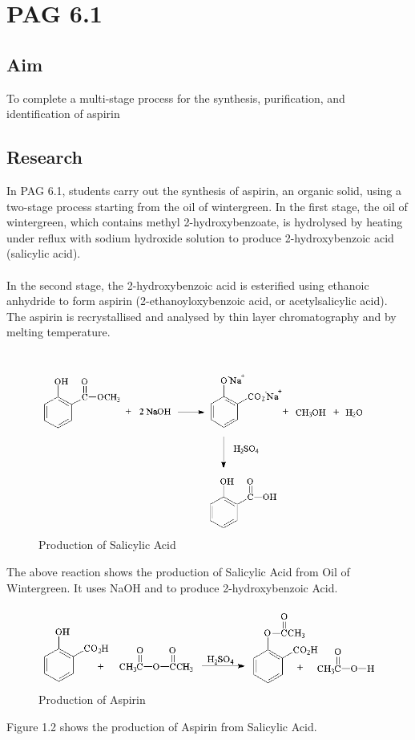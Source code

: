 \chapter{PAG 6.1}
\section{Aim}
To complete a multi-stage process for the synthesis, purification, and identification of aspirin
\section{Research}
In PAG 6.1, students carry out the synthesis of aspirin, an organic solid, using a two-stage process starting from the oil of wintergreen. 
In the first stage, the oil of wintergreen, which contains methyl 2-hydroxybenzoate, is hydrolysed by heating under reflux with sodium hydroxide solution to produce 2-hydroxybenzoic acid (salicylic acid).
\\\\
\noindent
In the second stage, the 2-hydroxybenzoic acid is esterified using ethanoic anhydride to form aspirin (2-ethanoyloxybenzoic acid, or acetylsalicylic acid). The aspirin is recrystallised and analysed by thin layer chromatography and by melting temperature.
\\\\
\begin{figure}[htp]
 \centering
 \includegraphics[scale=0.35]{salicylic-acid-syn.png}
 \caption{Production of Salicylic Acid \cite{olmsted1998synthesis}}
\end{figure}
\newpage
\noindent
The above reaction shows the production of Salicylic Acid from Oil of Wintergreen. It uses NaOH and  to produce 2-hydroxybenzoic Acid.

\begin{figure}[htp]
 \centering
 \includegraphics[scale=0.5]{aspirin actual.png}
 \caption{Production of Aspirin \cite{raubenheimer1913chemistry}}
\end{figure}
\noindent
Figure 1.2 shows the production of Aspirin from Salicylic Acid. 


